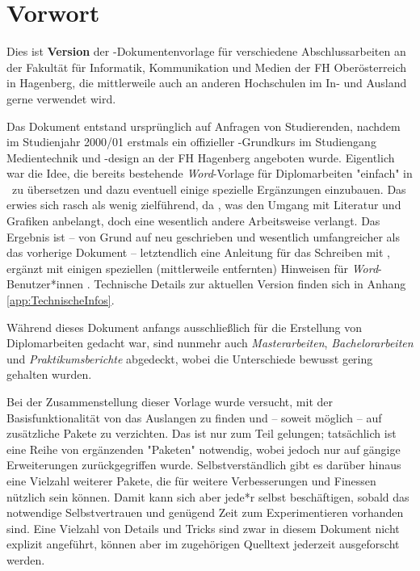 \chapter{Vorwort} 	%


Dies ist \textbf{Version \hgbDate} der \latex-Dokumentenvorlage für
verschiedene Abschlussarbeiten an der Fakultät für Informatik, Kommunikation
und Medien der FH Oberösterreich in Hagenberg, die mittlerweile auch an
anderen Hochschulen im In- und Ausland gerne verwendet wird.

Das Dokument entstand ursprünglich auf Anfragen von Studierenden, nachdem im
Studienjahr 2000/01 erstmals ein offizieller \latex-Grundkurs im Studiengang
Medientechnik und -design an der FH Hagenberg angeboten wurde. Eigentlich war
die Idee, die bereits bestehende \emph{Word}-Vorlage für Diplomarbeiten
"einfach" in \latex\ zu übersetzen und dazu eventuell einige spezielle
Ergänzungen einzubauen. Das erwies sich rasch als wenig zielführend, da
\latex, \va was den Umgang mit Literatur und Grafiken anbelangt, doch eine
wesentlich andere Arbeitsweise verlangt. Das Ergebnis ist -- von Grund auf
neu geschrieben und wesentlich umfangreicher als das vorherige Dokument --
letztendlich eine Anleitung für das Schreiben mit \latex, ergänzt mit einigen
speziellen (mittlerweile entfernten) Hinweisen für \emph{Word}-Benutzer*innen
. Technische Details zur aktuellen Version finden sich in Anhang
\ref{app:TechnischeInfos}.

Während dieses Dokument anfangs ausschließlich für die Erstellung von
Diplomarbeiten gedacht war, sind nunmehr auch \emph{Masterarbeiten},
\emph{Bachelor\-arbeiten} und \emph{Praktikumsberichte} abgedeckt, wobei die
Unterschiede bewusst gering gehalten wurden.

Bei der Zusammenstellung dieser Vorlage wurde versucht, mit der
Basisfunktionalität von \latex das Auslangen zu finden und -- soweit möglich
-- auf zusätzliche Pakete zu verzichten. Das ist nur zum Teil gelungen;
tat\-säch\-lich ist eine Reihe von ergänzenden "Paketen" notwendig, wobei
jedoch nur auf gängige Erweiterungen zurückgegriffen wurde.
Selbstverständlich gibt es darüber hinaus eine Vielzahl weiterer Pakete, die
für weitere Verbesserungen und Finessen nützlich sein können. Damit kann sich
aber jede*r selbst beschäftigen, sobald das notwendige Selbstvertrauen und
genügend Zeit zum Experimentieren vorhanden sind. Eine Vielzahl von Details
und Tricks sind zwar in diesem Dokument nicht explizit angeführt, können aber
im zugehörigen Quelltext jederzeit ausgeforscht werden.

